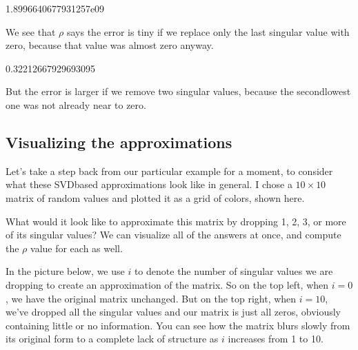 \documentclass[letterpaper,10pt,english]{jupyterBook}
\begin{document}
\begin{sphinxVerbatim}[commandchars=\\\{\}]
1.8996640677931257e\PYGZhy{}09
\end{sphinxVerbatim}

\sphinxAtStartPar
We see that \(\rho\) says the error is tiny if we replace only the last singular value with zero, because that value was almost zero anyway.

\begin{sphinxVerbatim}[commandchars=\\\{\}]
   
\end{sphinxVerbatim}

\begin{sphinxVerbatim}[commandchars=\\\{\}]
0.32212667929693095
\end{sphinxVerbatim}

\sphinxAtStartPar
But the error is larger if we remove two singular values, because the second\sphinxhyphen{}lowest one was not already near to zero.


\subsection{Visualizing the approximations}
\label{\detokenize{chapter-16-matrices:visualizing-the-approximations}}
\sphinxAtStartPar
Let’s take a step back from our particular example for a moment, to consider what these SVD\sphinxhyphen{}based approximations look like in general.  I chose a \(10\times10\) matrix of random values and plotted it as a grid of colors, shown here.

\sphinxAtStartPar
{}

\sphinxAtStartPar
What would it look like to approximate this matrix by dropping 1, 2, 3, or more of its singular values?  We can visualize all of the answers at once, and compute the \(\rho\) value for each as well.

\sphinxAtStartPar
In the picture below, we use \(i\) to denote the number of singular values we are dropping to create an approximation of the matrix.  So on the top left, when \(i=0\), we have the original matrix unchanged.  But on the top right, when \(i=10\), we’ve dropped all the singular values and our matrix is just all zeros, obviously containing little or no information.  You can see how the matrix blurs slowly from its original form to a complete lack of structure as \(i\) increases from 1 to 10.
\end{document}
